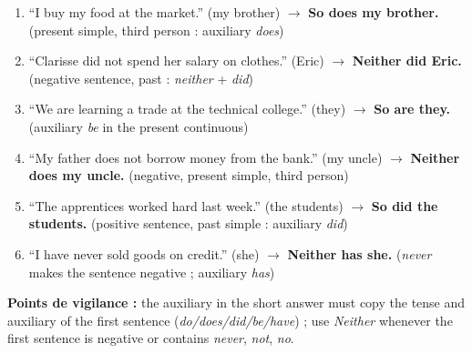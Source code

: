 \documentclass[11pt]{article}
\begin{document}
\begin{corrige}
\begin{enumerate}
\item ``I buy my food at the market.'' (my brother) $\rightarrow$ \textbf{So does my brother.} (present simple, third person : auxiliary \emph{does})
\item ``Clarisse did not spend her salary on clothes.'' (Eric) $\rightarrow$ \textbf{Neither did Eric.} (negative sentence, past : \emph{neither} + \emph{did})
\item ``We are learning a trade at the technical college.'' (they) $\rightarrow$ \textbf{So are they.} (auxiliary \emph{be} in the present continuous)
\item ``My father does not borrow money from the bank.'' (my uncle) $\rightarrow$ \textbf{Neither does my uncle.} (negative, present simple, third person)
\item ``The apprentices worked hard last week.'' (the students) $\rightarrow$ \textbf{So did the students.} (positive sentence, past simple : auxiliary \emph{did})
\item ``I have never sold goods on credit.'' (she) $\rightarrow$ \textbf{Neither has she.} (\emph{never} makes the sentence negative ; auxiliary \emph{has})
\end{enumerate}
\textbf{Points de vigilance :} the auxiliary in the short answer must copy the tense and auxiliary of the first sentence (\emph{do/does/did/be/have}) ; use \emph{Neither} whenever the first sentence is negative or contains \emph{never}, \emph{not}, \emph{no}.
\end{corrige}
\end{document}

